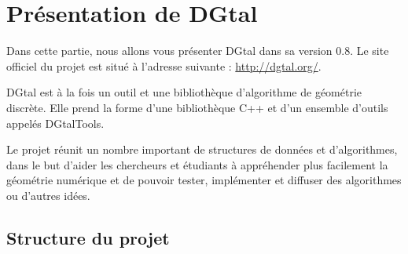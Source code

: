 \documentclass[11pt, french, screen]{report-rd-info}
\begin{document}





\chapter{Présentation de DGtal}

Dans cette partie, nous allons vous présenter DGtal dans sa version 0.8. Le site officiel du projet est situé à l'adresse suivante : \url{http://dgtal.org/}.

DGtal est à la fois un outil et une bibliothèque d'algorithme de géométrie discrète. Elle prend la forme d'une bibliothèque C++ et d'un ensemble d'outils appelés DGtalTools.

Le projet réunit un nombre important de structures de données et d'algorithmes, dans le but d'aider les chercheurs et étudiants à appréhender plus facilement la géométrie numérique et de pouvoir tester, implémenter et diffuser des algorithmes ou d'autres idées.



\section{Structure du projet}
\end{document}
